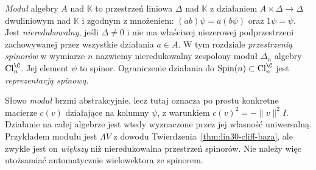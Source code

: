 \begin{definicja}
\label{def:lin31-spinor}
\emph{Moduł} algebry $A$ nad $\mathbb K$ to przestrzeń liniowa
$\Delta$ nad $\mathbb K$ z działaniem $A\times\Delta\to\Delta$
dwuliniowym nad $\mathbb K$ i zgodnym
z mnożeniem: $(ab)\psi=a(b\psi)$
oraz $1\psi=\psi$. Jest \emph{nieredukowalny},
jeśli $\Delta\ne0$ i nie ma właściwej niezerowej podprzestrzeni
zachowywanej przez wszystkie działania $a\in A$.
W tym rozdziale \emph{przestrzenią spinorów}
w wymiarze $n$ nazwiemy nieredukowalny zespolony
moduł $\Delta_n$ algebry $\operatorname{Cl}^{\C}_n$.
Jej element $\psi$ to spinor. Ograniczenie
działania do $\operatorname{Spin}(n)\subset
\operatorname{Cl}^{\C}_n$ jest
\emph{reprezentacją spinową}.
\end{definicja}

Słowo \emph{moduł} brzmi abstrakcyjnie, lecz tutaj
oznacza po prostu konkretne macierze $c(v)$
działające na kolumny $\psi$, z warunkiem
$c(v)^2=-\|v\|^2 I$. Działanie na całej algebrze
jest wtedy wyznaczone przez jej własność uniwersalną.
Przykładem modułu jest $\Lambda V$ z dowodu
Twierdzenia~\ref{thm:lin30-cliff-baza}, ale zwykle jest
on \emph{większy} niż nieredukowalna przestrzeń
spinorów. Nie należy więc utożsamiać automatycznie
wielowektora ze spinorem.


